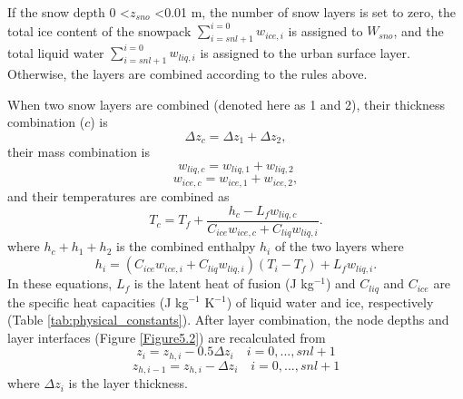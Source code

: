 \documentclass[12pt,authoryear]{elsarticle}
\numberwithin{equation}{section} %
\begin{document}
If the snow depth 0 <$z_{sno}$ <0.01 m, the number of snow layers is set to zero, the total ice content of the snowpack $\sum_{i=snl+1}^{i=0}w_{ice,i}$ is assigned to $W_{sno}$, and the total liquid water $\sum_{i=snl+1}^{i=0}w_{liq,i}$ is assigned to the urban surface layer. Otherwise, the layers are combined according to the rules above.

When two snow layers are combined (denoted here as 1 and 2), their thickness combination ($c$) is
\begin{equation}
\label{eq:snow_layer}
\Delta z_{c} = \Delta z_{1} +\Delta z_{2},
\end{equation}
their mass combination is
\begin{equation}
w_{liq,c} = w_{liq,1}+w_{liq,2}
\end{equation}
\begin{equation}
w_{ice,c} = w_{ice,1}+w_{ice,2},
\end{equation}
and their temperatures are combined as
\begin{equation}
\label{eq:snow_layer_temperature}
T_{c} = T_{f}+\frac{h_{c}-L_{f}w_{liq,c}}{C_{ice}w_{ice,c}+C_{liq}w_{liq,i}}.
\end{equation}
where $h_{c}+h_{1}+h_{2}$ is the combined enthalpy $h_{i}$ of the two layers where
\begin{equation}
h_{i} = (C_{ice}w_{ice,i}+C_{liq}w_{liq,i})(T_{i} - T_{f})+L_{f}w_{liq,i}.
\end{equation}
In these equations, $L_{f}$ is the latent heat of fusion (J kg$^{-1}$) and $C_{liq}$ and $C_{ice}$ are the specific heat capacities (J kg$^{-1}$ K$^{-1}$) of liquid water and ice, respectively (Table \ref{tab:physical_constants}). After layer combination, the node depths and layer interfaces (Figure \ref{Figure5.2}) are recalculated from
\begin{equation}
\label{eq:node_depth_i}
z_{i} = z_{h,i}-0.5\Delta z_{i} \quad i=0,...,snl+1
\end{equation}
\begin{equation}
\label{eq:node_depth_i-1}
z_{h,i-1} = z_{h,i} - \Delta z_{i} \quad i=0,...,snl+1
\end{equation}
where $\Delta z_{i}$ is the layer thickness. 
\end{document}
